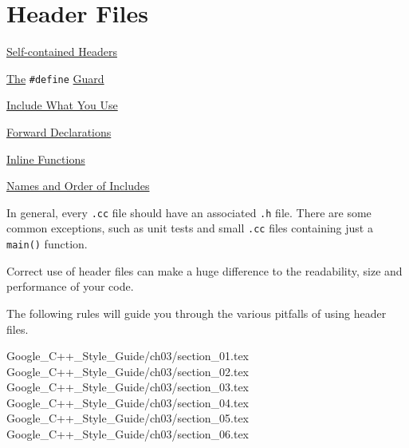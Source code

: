 
\chapter{Header Files}\label{ch:header-files}

\begin{introduction}
    \item \hyperref[sec:self-contained-headers]{Self-contained Headers}
    \item \hyperref[sec:the-define-guard]{The} \texttt{#define} \hyperref[sec:the-define-guard]{Guard}
    \item \hyperref[sec:include-what-you-use]{Include What You Use}
    \item \hyperref[sec:forward_declarations]{Forward Declarations}
    \item \hyperref[sec:inline-functions]{Inline Functions}
    \item \hyperref[sec:names-and-order-of-includes]{Names and Order of Includes}
\end{introduction}

In general, every \texttt{.cc} file should have an associated \texttt{.h} file. There are some common exceptions, such as unit tests and small \texttt{.cc} files containing just a \texttt{main()} function.

Correct use of header files can make a huge difference to the readability, size and performance of your code.

The following rules will guide you through the various pitfalls of using header files.

{Google_C++_Style_Guide/ch03/section_01.tex}
{Google_C++_Style_Guide/ch03/section_02.tex}
{Google_C++_Style_Guide/ch03/section_03.tex}
{Google_C++_Style_Guide/ch03/section_04.tex}
{Google_C++_Style_Guide/ch03/section_05.tex}
{Google_C++_Style_Guide/ch03/section_06.tex}










